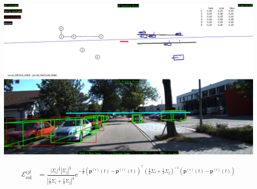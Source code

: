 \documentclass{beamer} %
\newcommand{\pos}[2]{\mathbf{p}^{(#1)}(#2)}
\newcommand{\EnergyCol}{\mathcal{E}^{ijt}_{\text{col}}}
\begin{document}
\begin{frame}
  \includegraphics[width=\textwidth]{graphics/61WithGraphicalModel.pdf}
\end{frame}

\begin{frame}
  \pause

  \begin{align}
    \EnergyCol &=
    \frac{|\Sigma_i|^\frac{1}{4}|\Sigma_j|^\frac{1}{4}}
    {|\frac{1}{2}\Sigma_i + \frac{1}{2}\Sigma_j|^\frac{1}{2}}
    e^{-\frac{1}{8}
      \left(\pos{i}{t} - \pos{i}{t}\right)^\top
      \left(\frac{1}{2}\Sigma_i + \frac{1}{2}\Sigma_j\right)^{-1}
      \left(\pos{i}{t} - \pos{i}{t}\right)
      }
  \end{align}
\end{frame}
\end{document}
